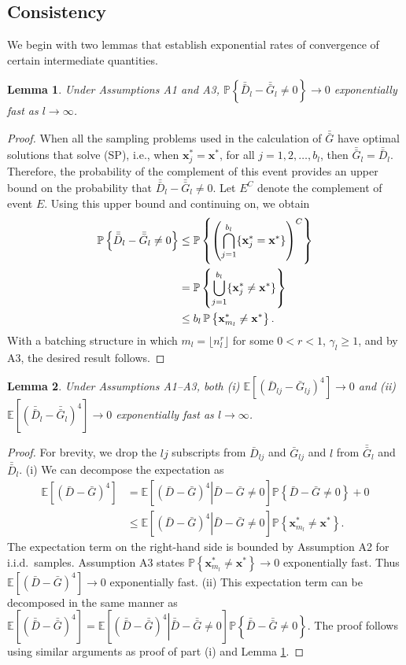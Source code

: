 \documentclass[12pt]{article}
\newtheorem{lemma}{Lemma}
\newcommand{\p}[1]{\mathbb{P} \left\{ #1 \right\}}
\newcommand{\e}[1]{\mathbb{E} \left[ #1 \right]
}
\newcommand{\x}{\mathbf{x}}
\newcommand{\xs}{\x^*}
\newcommand{\nbl}{b_l}
\newcommand{\gb}{\bar{G}}
\newcommand{\gbb}{\bar{\gb}}
\newcommand{\db}{\bar{D}}
\newcommand{\dbb}{\bar{\db}}
\begin{document}
\subsection{Consistency}
\label{subsec:conv} 

We begin with two lemmas that establish exponential rates of convergence of certain intermediate quantities.

\begin{lemma} \label{lem:gbb_prob}
	Under Assumptions A1 and A3, $\p{\dbb_l - \gbb_l \neq 0} \rightarrow 0$ exponentially fast as $l \rightarrow \infty$.
\end{lemma}

\begin{proof} When all the sampling problems used in the calculation of $\gbb$ have optimal solutions that solve (SP), i.e., when $\xs_{j} = \xs$, for all $j=1,2,\ldots, \nbl$, then $\gbb_l = \dbb_l$. 
Therefore, the probability of the complement of this event provides an upper bound on the probability that $\dbb_l - \gbb_l \neq 0$. 
Let $E^C$ denote the complement of event $E$. 
Using this upper bound and continuing on, we obtain
	\begin{align}
		\p{\dbb_l - \gbb_l \neq 0} & \leq \p{\left( \bigcap_{j=1}^{\nbl} \{\xs_{j} = \xs\} \right)^C} \notag \\
		& = \p{ \bigcup_{j=1}^{\nbl} \{\xs_{j} \neq \xs\}} \notag \\
		& \leq \nbl \, \p{ \xs_{m_l} \neq \xs }. \notag
	\end{align}
	With a batching structure in which $m_l = \lfloor n_l^{r} \rfloor$ for some $0<r<1$,  $\gamma_l \geq 1$, and by A3, the desired result follows.
\end{proof}

\begin{lemma} \label{lem:gb_gbb_l4}
	Under Assumptions A1--A3, both (i) $\e{(\db_{lj} - \gb_{lj})^4} \rightarrow 0$ and (ii) $\e{(\dbb_l - \gbb_l)^4} \rightarrow 0$ exponentially fast as $l \rightarrow \infty$.
\end{lemma}

\begin{proof}
	For brevity, we drop the $lj$ subscripts from $\db_{lj}$ and $\gb_{lj}$ and $l$ from $\gbb_l$ and $\dbb_l$.
	(i) We can decompose the expectation as
	\begin{align*}
		\e{(\db - \gb)^4} & = \e{ \left.(\db - \gb)^4 \right| \db - \gb \neq 0} \p{\db - \gb \neq 0} + 0\\
		& \leq \e{ \left.(\db - \gb)^4 \right| \db - \gb \neq 0} \p{ \xs_{m_l}  \neq \xs}.
	\end{align*}
	The expectation term on the right-hand side is bounded by Assumption A2 for i.i.d.\ samples.  
        Assumption A3 states $\p{\xs_{m_l} \neq \xs} \rightarrow 0$ exponentially fast.  
        Thus $\e{(\db - \gb)^4} \rightarrow 0$ exponentially fast.
(ii) This expectation term can be decomposed in the same manner as
$
		\e{(\dbb - \gbb)^4}  = \e{\left. (\dbb - \gbb)^4 \right| \dbb - \gbb \neq 0} \p{\dbb - \gbb \neq 0}.
$ 
	The proof follows using similar arguments as proof of part (i) and Lemma \ref{lem:gbb_prob}.
\end{proof}
\end{document}
